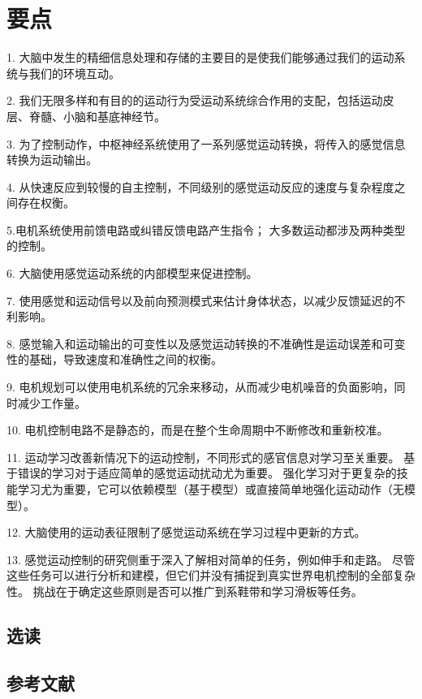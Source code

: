 \section{要点}

1. 大脑中发生的精细信息处理和存储的主要目的是使我们能够通过我们的运动系统与我们的环境互动。

2. 我们无限多样和有目的的运动行为受运动系统综合作用的支配，包括运动皮层、脊髓、小脑和基底神经节。

3. 为了控制动作，中枢神经系统使用了一系列感觉运动转换，将传入的感觉信息转换为运动输出。

4. 从快速反应到较慢的自主控制，不同级别的感觉运动反应的速度与复杂程度之间存在权衡。

5.电机系统使用前馈电路或纠错反馈电路产生指令； 大多数运动都涉及两种类型的控制。

6. 大脑使用感觉运动系统的内部模型来促进控制。

7. 使用感觉和运动信号以及前向预测模式来估计身体状态，以减少反馈延迟的不利影响。

8. 感觉输入和运动输出的可变性以及感觉运动转换的不准确性是运动误差和可变性的基础，导致速度和准确性之间的权衡。

9. 电机规划可以使用电机系统的冗余来移动，从而减少电机噪音的负面影响，同时减少工作量。

10. 电机控制电路不是静态的，而是在整个生命周期中不断修改和重新校准。

11. 运动学习改善新情况下的运动控制，不同形式的感官信息对学习至关重要。 基于错误的学习对于适应简单的感觉运动扰动尤为重要。 强化学习对于更复杂的技能学习尤为重要，它可以依赖模型（基于模型）或直接简单地强化运动动作（无模型）。

12. 大脑使用的运动表征限制了感觉运动系统在学习过程中更新的方式。

13. 感觉运动控制的研究侧重于深入了解相对简单的任务，例如伸手和走路。 尽管这些任务可以进行分析和建模，但它们并没有捕捉到真实世界电机控制的全部复杂性。 挑战在于确定这些原则是否可以推广到系鞋带和学习滑板等任务。

\subsection{选读}
\subsection{参考文献}

